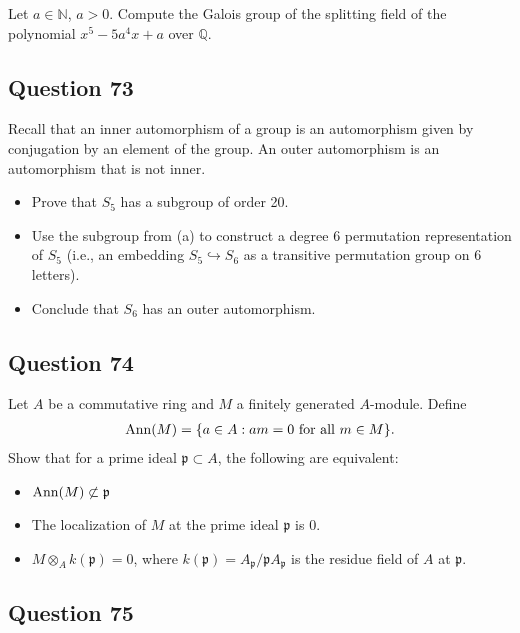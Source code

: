 \documentclass[12pt]{article}
\providecommand{\tightlist}{%
  \setlength{\itemsep}{0pt}\setlength{\parskip}{0pt}}
\begin{document}
Let \(a\in\mathbb N\), \(a>0\). Compute the Galois group of the
splitting field of the polynomial \(x^5-5a^4x+a\) over \(\mathbb Q\).

\hypertarget{question-73}{%
\subsection{Question 73}\label{question-73}}

Recall that an inner automorphism of a group is an automorphism given by
conjugation by an element of the group. An outer automorphism is an
automorphism that is not inner.

\begin{itemize}
\tightlist
\item
  Prove that \(S_5\) has a subgroup of order 20.
\item
  Use the subgroup from (a) to construct a degree 6 permutation
  representation of \(S_5\) (i.e., an embedding
  \(S_5 \hookrightarrow S_6\) as a transitive permutation group on 6
  letters).
\item
  Conclude that \(S_6\) has an outer automorphism.
\end{itemize}

\hypertarget{question-74}{%
\subsection{Question 74}\label{question-74}}

Let \(A\) be a commutative ring and \(M\) a finitely generated
\(A\)-module. Define \begin{align*}
  \mathrm{Ann}(M) = \{a \in A: am = 0 \text{ for all } m \in M\}
.\end{align*} Show that for a prime ideal \(\mathfrak p \subset A\), the
following are equivalent:

\begin{itemize}
\item
  \(\mathrm{Ann}(M) \not\subset \mathfrak p\)
\item
  The localization of \(M\) at the prime ideal \(\mathfrak p\) is \(0\).
\item
  \(M \otimes_A k(\mathfrak p) = 0\), where
  \(k(\mathfrak p) = A_{\mathfrak p}/\mathfrak p A_{\mathfrak p}\) is
  the residue field of \(A\) at \(\mathfrak p\).
\end{itemize}

\hypertarget{question-75}{%
\subsection{Question 75}\label{question-75}}
\end{document}
